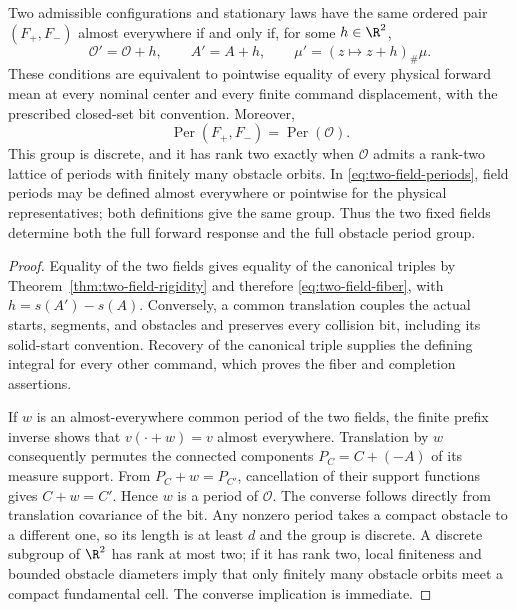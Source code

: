 \begin{corollary}
\label{cor:two-field-fiber}
Two admissible configurations and stationary laws have the same
ordered pair $(F_+,F_-)$ almost everywhere if and only if, for some
$h\in\R^2$,
\begin{equation}\label{eq:two-field-fiber}
 \mathcal O'=\mathcal O+h,\qquad A'=A+h,
                         \qquad \mu'=(z\mapsto z+h)_\#\mu.
\end{equation}
These conditions are equivalent to pointwise equality of every
physical forward mean at every nominal center and every finite
command displacement, with the prescribed closed-set bit convention.
Moreover,
\begin{equation}\label{eq:two-field-periods}
                  \operatorname{Per}(F_+,F_-)
                              =\operatorname{Per}(\mathcal O).
\end{equation}
This group is discrete, and it has rank two exactly when
$\mathcal O$ admits a rank-two lattice of periods with finitely
many obstacle orbits.  In \eqref{eq:two-field-periods}, field
periods may be defined almost everywhere or pointwise for the
physical representatives; both definitions give the same group.
Thus the two fixed fields determine both the full forward response
and the full obstacle period group.
\end{corollary}
\begin{proof}
Equality of the two fields gives equality of the canonical
triples by Theorem~\ref{thm:two-field-rigidity} and therefore
\eqref{eq:two-field-fiber}, with $h=s(A')-s(A)$.
Conversely, a common translation couples the actual starts,
segments, and obstacles and preserves every collision bit,
including its solid-start convention.  Recovery of the canonical
triple supplies the defining integral for every other command,
which proves the fiber and completion assertions.

If $w$ is an almost-everywhere common period of the two fields,
the finite prefix inverse shows that $v(\cdot+w)=v$ almost
everywhere.  Translation by $w$ consequently permutes the connected
components $P_C=C+(-A)$ of its measure support.
From $P_C+w=P_{C'}$, cancellation of their support functions gives
$C+w=C'$.  Hence $w$ is a period of $\mathcal O$.
The converse follows directly from translation covariance of the
bit.  Any nonzero period takes a compact obstacle to a different
one, so its length is at least $d$ and the group is discrete.
A discrete subgroup of $\R^2$ has rank at most two; if it has rank
two, local finiteness and bounded obstacle diameters imply that
only finitely many obstacle orbits meet a compact fundamental
cell.  The converse implication is immediate.
\end{proof}

